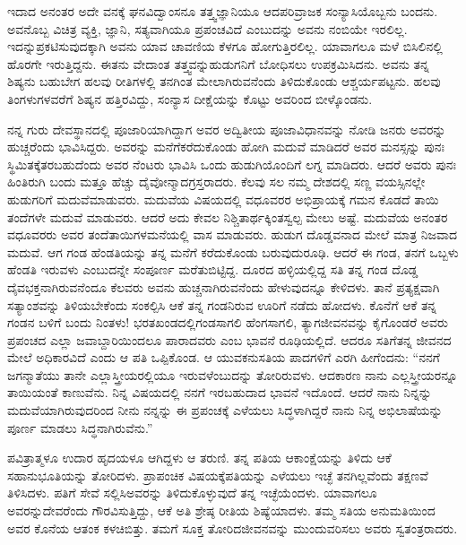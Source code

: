 ಇದಾದ ಅನಂತರ ಅದೇ ವನಕ್ಕೆ ಘನವಿದ್ವಾಂಸನೂ ತತ್ತ್ವಜ್ಞಾನಿಯೂ ಆದ\break ಪರಿವ್ರಾಜಕ ಸಂನ್ಯಾಸಿಯೊಬ್ಬನು ಬಂದನು. ಅವನೊಬ್ಬ ವಿಚಿತ್ರ ವ್ಯಕ್ತಿ, ಜ್ಞಾನಿ, ಸತ್ಯವಾಗಿಯೂ ಪ್ರಪಂಚವಿದೆ ಎಂಬುದನ್ನು ಅವನು ನಂಬಿಯೇ ಇರಲಿಲ್ಲ. ಇದನ್ನು\break ಪ್ರಕಟಿಸುವುದಕ್ಕಾಗಿ ಅವನು ಯಾವ ಚಾವಣಿಯ ಕೆಳಗೂ ಹೋಗುತ್ತಿರಲಿಲ್ಲ. ಯಾವಾಗಲೂ ಮಳೆ ಬಿಸಿಲಿನಲ್ಲಿ ಹೊರಗೇ ಇರುತ್ತಿದ್ದನು. ಈತನು ವೇದಾಂತ ತತ್ತ್ವವನ್ನು\break ಹುಡುಗನಿಗೆ ಬೋಧಿಸಲು ಉಪಕ್ರಮಿಸಿದನು. ಅವನು ತನ್ನ ಶಿಷ್ಯನು ಬಹುಬೇಗ ಹಲವು ರೀತಿಗಳಲ್ಲಿ ತನಗಿಂತ ಮೇಲಾಗಿರುವನೆಂದು ತಿಳಿದುಕೊಂಡು ಆಶ್ಚರ್ಯಪಟ್ಟನು. ಹಲವು ತಿಂಗಳುಗಳವರೆಗೆ ಶಿಷ್ಯನ ಹತ್ತಿರವಿದ್ದು, ಸಂನ್ಯಾಸ ದೀಕ್ಷೆಯನ್ನು ಕೊಟ್ಟು ಅವರಿಂದ ಬೀಳ್ಕೊಂಡನು.

ನನ್ನ ಗುರು ದೇವಸ್ಥಾನದಲ್ಲಿ ಪೂಜಾರಿಯಾಗಿದ್ದಾಗ ಅವರ ಅದ್ವಿತೀಯ ಪೂಜಾ\-ವಿಧಾನವನ್ನು ನೋಡಿ ಜನರು ಅವರನ್ನು ಹುಚ್ಚರೆಂದು ಭಾವಿಸಿದ್ದರು. ಅವರನ್ನು ಮನೆಗೆ\break ಕರೆದುಕೊಂಡು ಹೋಗಿ ಮದುವೆ ಮಾಡಿದರೆ ಅವರ ಮನಸ್ಸನ್ನು ಪುನಃ ಸ್ಥಿಮಿತಕ್ಕೆ\break ತರಬಹುದೆಂದು ಅವರ ನೆಂಟರು ಭಾವಿಸಿ ಒಂದು ಹುಡುಗಿಯೊಂದಿಗೆ ಲಗ್ನ ಮಾಡಿ\-ದರು. ಆದರೆ ಅವರು ಪುನಃ ಹಿಂತಿರುಗಿ ಬಂದು ಮತ್ತೂ ಹೆಚ್ಚು ದೈವೋನ್ಮಾದಗ್ರಸ್ತರಾದರು. ಕೆಲವು ಸಲ ನಮ್ಮ ದೇಶದಲ್ಲಿ ಸಣ್ಣ ವಯಸ್ಸಿನಲ್ಲೇ ಹುಡುಗರಿಗೆ ಮದುವೆ\break ಮಾಡುವರು. ಮದುವೆಯ ವಿಷಯದಲ್ಲಿ ವಧೂವರರ ಅಭಿಪ್ರಾಯಕ್ಕೆ ಗಮನ ಕೊಡದೆ ತಾಯಿ ತಂದೆಗಳೇ ಮದುವೆ ಮಾಡುವರು. ಆದರೆ ಅದು ಕೇವಲ ನಿಶ್ಚಿತಾರ್ಥಕ್ಕಿಂತ\break ಸ್ವಲ್ಪ ಮೇಲು ಅಷ್ಟೆ. ಮದುವೆಯ ಅನಂತರ ವಧೂವರರು ಅವರ ತಂದೆತಾಯಿಗಳ\break ಮನೆಯಲ್ಲಿ ವಾಸ ಮಾಡುವರು. ಹುಡುಗ ದೊಡ್ಡವನಾದ ಮೇಲೆ ಮಾತ್ರ ನಿಜವಾದ ಮದುವೆ. ಆಗ ಗಂಡ ಹೆಂಡತಿಯನ್ನು ತನ್ನ ಮನೆಗೆ ಕರೆದುಕೊಂಡು ಬರುವುದು\break ರೂಢಿ. ಆದರೆ ಈ ಗಂಡ, ತನಗೆ ಒಬ್ಬಳು ಹೆಂಡತಿ ಇರುವಳು ಎಂಬುದನ್ನೇ ಸಂಪೂರ್ಣ ಮರೆತುಬಿಟ್ಟಿದ್ದ. ದೂರದ ಹಳ್ಳಿಯಲ್ಲಿದ್ದ ಸತಿ ತನ್ನ ಗಂಡ ದೊಡ್ಡ ದೈವಭಕ್ತನಾಗಿರುವನೆಂದೂ ಕೆಲವರು ಅವನು ಹುಚ್ಚನಾಗಿರುವನೆಂದು ಹೇಳುವುದನ್ನೂ ಕೇಳಿದಳು. ತಾನೆ ಪ್ರತ್ಯಕ್ಷವಾಗಿ ಸತ್ಯಾಂಶವನ್ನು ತಿಳಿಯಬೇಕೆಂದು ಸಂಕಲ್ಪಿಸಿ ಆಕೆ ತನ್ನ ಗಂಡನಿರುವ ಊರಿಗೆ ನಡೆದು ಹೋದಳು. ಕೊನೆಗೆ ಆಕೆ ತನ್ನ ಗಂಡನ ಬಳಿಗೆ ಬಂದು ನಿಂತಳು! ಭರತಖಂಡದಲ್ಲಿ\break ಗಂಡಸಾಗಲಿ ಹೆಂಗಸಾಗಲಿ, ತ್ಯಾಗಜೀವನವನ್ನು ಕೈಗೊಂಡರೆ ಅವರು ಪ್ರಪಂಚದ ಎಲ್ಲಾ ಜವಾಬ್ದಾರಿಯಿಂದಲೂ ಪಾರಾದವರು ಎಂಬ ಭಾವನೆ ರೂಢಿಯಲ್ಲಿದೆ. ಆದರೂ ಸತಿಗೆ\break ತನ್ನ ಜೀವನದ ಮೇಲೆ ಅಧಿಕಾರವಿದೆ ಎಂದು ಆ ಪತಿ ಒಪ್ಪಿಕೊಂಡ. ಆ ಯುವಕನು\break ಸತಿಯ ಪಾದಗಳಿಗೆ ಎರಗಿ ಹೀಗೆಂದನು: “ನನಗೆ ಜಗನ್ಮಾತೆಯು ತಾನೇ ಎಲ್ಲಾ\break ಸ್ತ್ರೀಯರಲ್ಲಿಯೂ ಇರುವಳೆಂಬುದನ್ನು ತೋರಿರುವಳು. ಆದಕಾರಣ ನಾನು ಎಲ್ಲ\break ಸ್ತ್ರೀಯರನ್ನೂ ತಾಯಿಯಂತೆ ಕಾಣುವೆನು. ನಿನ್ನ ವಿಷಯದಲ್ಲಿ ನನಗೆ ಇರಬಹುದಾದ ಭಾವನೆ ಇದೊಂದೆ. ಆದರೆ ನಾನು ನಿನ್ನನ್ನು ಮದುವೆಯಾಗಿರುವುದರಿಂದ ನೀನು ನನ್ನನ್ನು ಈ ಪ್ರಪಂಚಕ್ಕೆ ಎಳೆಯಲು ಸಿದ್ಧಳಾಗಿದ್ದರೆ ನಾನು ನಿನ್ನ ಅಭಿಲಾಷೆಯನ್ನು ಪೂರ್ಣ ಮಾಡಲು ಸಿದ್ಧನಾಗಿರುವೆನು.”

ಪವಿತ್ರಾತ್ಮಳೂ ಉದಾರ ಹೃದಯಳೂ ಆಗಿದ್ದಳು ಆ ತರುಣಿ. ತನ್ನ ಪತಿಯ ಆಕಾಂಕ್ಷೆಯನ್ನು ತಿಳಿದು ಆಕೆ ಸಹಾನುಭೂತಿಯನ್ನು ತೋರಿದಳು. ಪ್ರಾಪಂಚಿಕ ವಿಷಯಕ್ಕೆ\break ಪತಿಯನ್ನು ಎಳೆಯಲು ಇಚ್ಛೆ ತನಗಿಲ್ಲವೆಂದು ತಕ್ಷಣವೆ ತಿಳಿಸಿದಳು. ಪತಿಗೆ ಸೇವೆ ಸಲ್ಲಿಸಿ\break ಅವರನ್ನು ತಿಳಿದುಕೊಳ್ಳುವುದೆ ತನ್ನ ಇಚ್ಛೆಯೆಂದಳು. ಯಾವಾಗಲೂ ಅವರನ್ನು\break ದೇವರೆಂದು ಗೌರವಿಸುತ್ತಿದ್ದು, ಆಕೆ ಅತಿ ಶ್ರೇಷ್ಠ ರೀತಿಯ ಶಿಷ್ಯೆಯಾದಳು. ತಮ್ಮ ಸತಿಯ ಅನುಮತಿಯಿಂದ ಅವರ ಕೊನೆಯ ಆತಂಕ ಕಳಚಿಬಿತ್ತು. ತಮಗೆ ಸೂಕ್ತ ತೋರಿದ\break ಜೀವನವನ್ನು ಮುಂದುವರಿಸಲು ಅವರು ಸ್ವತಂತ್ರರಾದರು.

